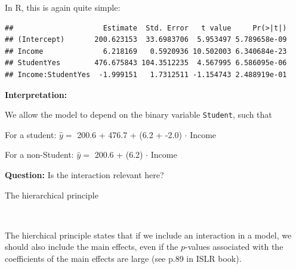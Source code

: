 \documentclass[10pt,ignorenonframetext,]{beamer}
\newenvironment{Shaded}{\begin{snugshade}}{\end{snugshade}}
\newcommand{\KeywordTok}[1]{\textcolor[rgb]{0.13,0.29,0.53}{\textbf{#1}}}
\newcommand{\StringTok}[1]{\textcolor[rgb]{0.31,0.60,0.02}{#1}}
\newcommand{\OperatorTok}[1]{\textcolor[rgb]{0.81,0.36,0.00}{\textbf{#1}}}
\newcommand{\NormalTok}[1]{#1}
\begin{document}
\begin{frame}[fragile]

In R, this is again quite simple:

\scriptsize

\begin{Shaded}
\end{Shaded}

\begin{verbatim}
##                     Estimate  Std. Error   t value     Pr(>|t|)
## (Intercept)       200.623153  33.6983706  5.953497 5.789658e-09
## Income              6.218169   0.5920936 10.502003 6.340684e-23
## StudentYes        476.675843 104.3512235  4.567995 6.586095e-06
## Income:StudentYes  -1.999151   1.7312511 -1.154743 2.488919e-01
\end{verbatim}

\normalsize

\textbf{Interpretation:}

We allow the model to depend on the binary variable \texttt{Student},
such that

For a student: \(\hat{y} =\) 200.6 + 476.7 + (6.2 + -2.0) \(\cdot\)
Income

For a non-Student: \(\hat{y} =\) 200.6 + (6.2) \(\cdot\) Income

\vspace{2mm}

\textbf{Question:} Is the interaction relevant here?

\end{frame}

\begin{frame}

\begin{block}{The hierarchical principle}

\(~\)

The hierchical principle states that if we include an interaction in a
model, we should also include the main effects, even if the \(p\)-values
associated with the coefficients of the main effects are large (see p.89
in ISLR book).

\end{block}

\end{frame}
\end{document}
